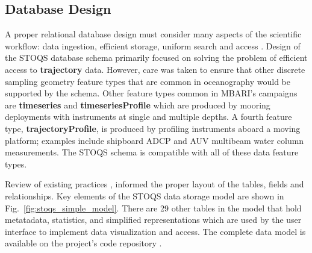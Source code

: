 \documentclass[conference]{IEEEtran}
\begin{document}
\subsection{Database Design}
A proper relational database design must consider many aspects of the scientific workflow: data ingestion, efficient storage, uniform search and access \cite{Bechini:2013:MSS:2425433.2425647}. Design of the STOQS database schema primarily focused on solving the problem of efficient access to \textbf{trajectory} data. However, care was taken to ensure that other discrete sampling geometry feature types \cite{DSG} that are common in oceanography would be supported by the schema.  Other feature types common in MBARI's campaigns are \textbf{timeseries} and \textbf{timeseriesProfile} which are produced by mooring deployments with instruments at single and multiple depths. 
A fourth feature type, \textbf{trajectoryProfile}, is produced by profiling instruments aboard a moving platform; examples include shipboard ADCP and AUV multibeam water column measurements. The STOQS schema is compatible with all of these data feature types.

Review of existing practices \cite{Wright}, \cite{MODB} informed the proper layout of the tables, fields and relationships.  Key elements of the STOQS data storage model are shown in Fig.~\ref{fig:stoqs_simple_model}. There are 29 other tables in the model that hold metatadata, statistics, and simplified representations which are used by the user interface to implement data visualization and access. The complete data model is available on the project's code repository \cite{STOQS}. 
\end{document}
